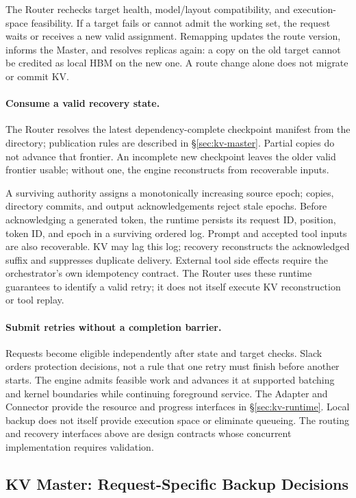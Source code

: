 The Router rechecks target health, model/layout compatibility, and
execution-space feasibility. If a target fails or cannot admit the
working set, the request waits or receives a new valid assignment.
Remapping updates the route version, informs the Master, and resolves
replicas again: a copy on the old target cannot be credited as local
HBM on the new one. A route change alone does not migrate or commit KV.

\paragraph{Consume a valid recovery state.}
The Router resolves the latest dependency-complete checkpoint manifest
from the directory; publication rules are described in
\S\ref{sec:kv-master}. Partial copies do not advance that frontier.
An incomplete new checkpoint leaves the older valid frontier usable;
without one, the engine reconstructs from recoverable inputs.

A surviving authority assigns a monotonically increasing source epoch;
copies, directory commits, and output acknowledgements reject stale epochs.
Before acknowledging a generated token, the runtime persists its request
ID, position, token ID, and epoch in a surviving ordered log. Prompt and
accepted tool inputs are also recoverable. KV may lag this log; recovery
reconstructs the acknowledged suffix and suppresses duplicate delivery.
External tool side effects require the orchestrator's own idempotency
contract. The Router uses these runtime guarantees to identify a valid
retry; it does not itself execute KV reconstruction or tool replay.

\paragraph{Submit retries without a completion barrier.}
Requests become eligible independently after state and target checks.
Slack orders protection decisions, not a rule that one retry must finish
before another starts. The engine admits feasible work and advances it
at supported batching and kernel boundaries while continuing foreground
service. The Adapter and Connector provide the resource and progress
interfaces in \S\ref{sec:kv-runtime}. Local backup does not itself provide execution
space or eliminate queueing. The routing and recovery interfaces above
are design contracts whose concurrent implementation requires validation.

\subsection{KV Master: Request-Specific Backup Decisions}
\label{sec:kv-placement}
\label{sec:kv-master}

